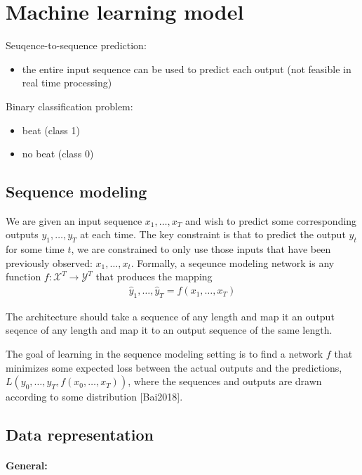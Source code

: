 \documentclass{article}
\begin{document}
\section{Machine learning model}

Seuqence-to-sequence prediction:
\begin{itemize}
\item the entire input sequence can be used to predict each output (not feasible in real time processing)
\end{itemize}

Binary classification problem:
\begin{itemize}
\item beat (class 1)
\item no beat (class 0)
\end{itemize}


\subsection{Sequence modeling}

We are given an input sequence $x_1, \dots, x_T$ and wish to predict some corresponding outputs $y_1, \dots, y_T$ at each time. The key constraint is that to predict the output $y_t$ for some time $t$, we are constrained to only use those inputs that have been previously observed: $x_1, \dots , x_t$. Formally, a seqeunce modeling network is any function $f : \mathcal X^{T} \rightarrow \mathcal Y^{T}$ that produces the mapping
\begin{align}
\hat y_1, \dots, \hat y_T = f(x_1,\dots, x_T)
\end{align}

The architecture should take a sequence of any length and map it an output seqence of any length and map it to an output sequence of the same length.

The goal of learning in the sequence modeling setting is to find a network $f$ that minimizes some expected loss between the actual outputs and the predictions, $L(y_0,\dots,y_T, f(x_0,\dots,x_T))$, where the sequences and outputs are drawn according to some distribution [Bai2018].



\subsection{Data representation}

\paragraph{General:}
\end{document}
